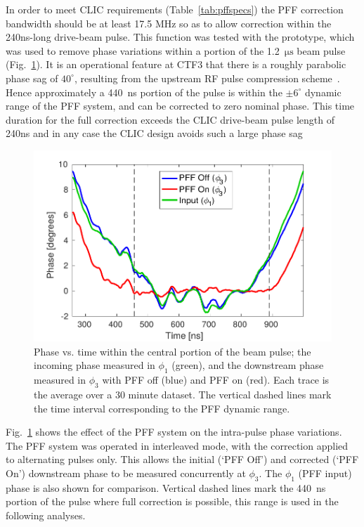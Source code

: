 \documentclass[%
 reprint,
 superscriptaddress,
 amsmath,
 amssymb,
 prl,
]{revtex4-1}
\begin{document}
In order to meet CLIC requirements (Table~\ref{tab:pffspecs}) the PFF 
correction bandwidth should be at least 17.5 MHz so as to allow correction 
within the 240ns-long drive-beam pulse. This function was tested with the
prototype, which was used to remove phase variations within a portion of the 
1.2~\(\mathrm{\mu s}\) beam pulse (Fig.~\ref{fig:shape}).  It is an 
operational feature at CTF3 that there is a roughly parabolic phase sag of 
\(40^\circ\), resulting from the upstream RF pulse compression 
scheme~\cite{CLICCDR}. Hence approximately a 440~ns portion of the pulse is 
within the \(\pm 6^\circ\) dynamic range of the PFF system, and can be 
corrected to zero nominal phase. 
This time duration for the full correction exceeds the CLIC drive-beam pulse 
length of 240ns and in any case the CLIC design avoids such 
a large phase sag~\cite{CLICCDR} 

\begin{figure}
	\includegraphics[width=\columnwidth]{figs/shape}
	\caption{\label{fig:shape}Phase vs. time within the central portion of the  
	beam pulse; the incoming phase measured in \(\phi_1\) 
	(green), and the downstream phase measured in \(\phi_3\) with PFF off 
	(blue) and PFF on (red). Each trace is the average over a 30 minute dataset.
	The vertical dashed lines mark the time interval corresponding to the PFF 
	dynamic range. }
\end{figure}

Fig.~\ref{fig:shape} shows the effect of the PFF system on the intra-pulse 
phase variations. The PFF system was operated in interleaved mode, with 
the correction applied to alternating pulses only. This allows 
the initial (`PFF Off') and corrected (`PFF On') downstream phase 
to be measured concurrently at \(\phi_3\). The \(\phi_1\) (PFF input) phase 
is also shown for comparison. Vertical dashed lines mark the 440~ns portion of 
the pulse where full correction is possible, this range is used in the 
following analyses. 
\end{document}
